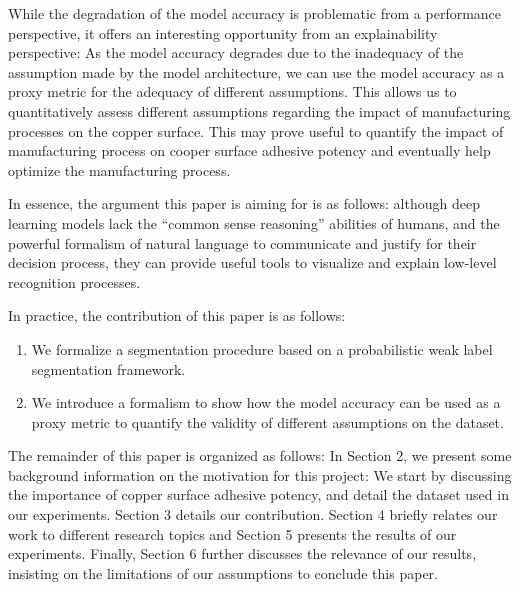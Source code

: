 \documentclass[10pt,twocolumn,letterpaper]{article}
\begin{document}
While the degradation of the model accuracy is problematic from a performance perspective,
it offers an interesting opportunity from an explainability perspective:
As the model accuracy degrades due to the inadequacy of the assumption 
made by the model architecture,
we can use the model accuracy as a proxy metric 
for the adequacy of different assumptions.
This allows us to quantitatively assess different assumptions regarding the impact 
of manufacturing processes on the copper surface. 
This may prove useful to quantify the impact of manufacturing process on cooper surface adhesive potency
and eventually help optimize the manufacturing process.
	
In essence, the argument this paper is aiming for is as follows: 
although deep learning models lack the ``common sense reasoning'' abilities of humans,
and the powerful formalism of natural language to communicate and justify for their decision process, 
they can provide useful tools to visualize and explain low-level recognition processes.

In practice, the contribution of this paper is as follows:
\begin{enumerate}
\item  We formalize a segmentation procedure based on a probabilistic weak label segmentation framework.
\item  We introduce a formalism to show how the model accuracy can be used as a proxy metric to quantify the validity of different assumptions on the dataset.
\end{enumerate}
	
The remainder of this paper is organized as follows:
In Section 2, we present some background information on the motivation for this project:
We start by discussing the importance of copper surface adhesive potency,
and detail the dataset used in our experiments. 
Section 3 details our contribution.
Section 4 briefly relates our work to different research topics 
and Section 5 presents the results of our experiments.
Finally, Section 6 further discusses the relevance of our results, insisting on the limitations of our assumptions to conclude this paper.
	
\end{document}
